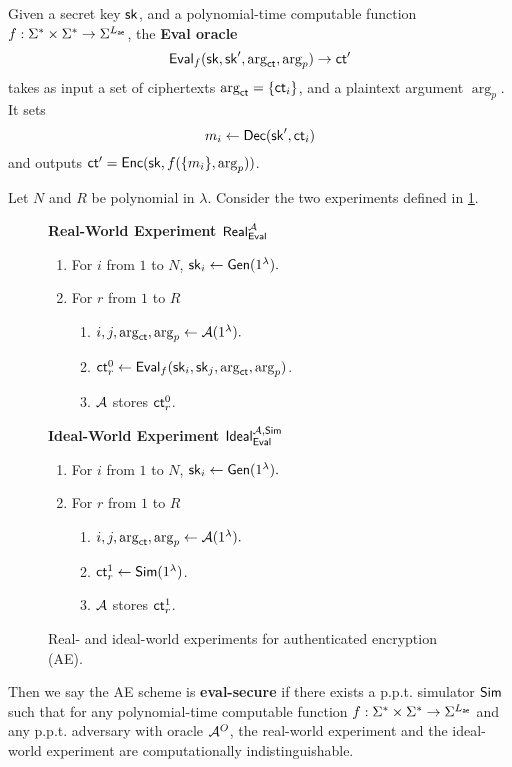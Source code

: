 \begin{definition}
\label{defn:AE-eval-oracle}
Given a secret key ${\mathsf{sk}}$, and a polynomial-time computable function $f: \Sigma^* \times \Sigma^* \to \Sigma^{L_{\mathsf{ae}}}$, the \textbf{Eval oracle} 
$$\mathsf{Eval}_{f}({\mathsf{sk}}, {\mathsf{sk}}', \arg_{\mathsf{ct}}, \arg_p) \to \mathsf{ct}'$$ takes as input a set of ciphertexts $\arg_{\mathsf{ct}} = \{\mathsf{ct}_i\}$, and a plaintext argument $\arg_{p}$. It sets 
$$m_i \leftarrow \mathsf{Dec}({\mathsf{sk}}', \mathsf{ct}_i)$$ 
and outputs $\mathsf{ct}' = \mathsf{Enc}({\mathsf{sk}}, f(\{m_i\}, \arg_p))$.
\end{definition}
\begin{definition}
\label{defn:AE-eval-security}
Let $N$ and $R$ be polynomial in $\lambda$. Consider the two experiments defined in \cref{expr:AE-real-ideal-world}.

\begin{figure}[ht!]
\begin{framed}
\textbf{Real-World Experiment $\mathsf{Real}_{\mathsf{Eval}}^{\mathcal{A}}$}
\begin{enumerate}
    \item For $i$ from $1$ to $N$, ${\mathsf{sk}}_i \leftarrow \mathsf{Gen}(1^{\lambda}).$
    \item For $r$ from $1$ to $R$
    \begin{enumerate}
        \item $i, j, \arg_{\mathsf{ct}}, \arg_p \leftarrow \mathcal{A}(1^{\lambda}).$
        \item $\mathsf{ct}^{0}_r \leftarrow \mathsf{Eval}_f({\mathsf{sk}}_i, {\mathsf{sk}}_j, \arg_{\mathsf{ct}}, \arg_p)$.
        \item $\mathcal{A}$ stores $\mathsf{ct}^{0}_r$.
    \end{enumerate}
\end{enumerate}
\vspace{0.2cm}
\textbf{Ideal-World Experiment $\mathsf{Ideal}_{\mathsf{Eval}}^{\mathcal{A}, \mathsf{Sim}}$}
\begin{enumerate}
    \item For $i$ from $1$ to $N$, ${\mathsf{sk}}_i \leftarrow \mathsf{Gen}(1^{\lambda}).$
    \item For $r$ from $1$ to $R$
    \begin{enumerate}
        \item $i, j, \arg_{\mathsf{ct}}, \arg_p \leftarrow \mathcal{A}(1^{\lambda}).$
        \item $\mathsf{ct}^{1}_r \leftarrow \mathsf{Sim}(1^{\lambda})$.
        \item $\mathcal{A}$ stores $\mathsf{ct}^{1}_r$.
    \end{enumerate}
\end{enumerate}
\end{framed}
\caption{Real- and ideal-world experiments for authenticated encryption (AE).}
\label{expr:AE-real-ideal-world}
\end{figure}

Then we say the AE scheme is \textbf{eval-secure} if there exists a p.p.t. simulator $\mathsf{Sim}$ such that for any polynomial-time computable function $f: \Sigma^* \times \Sigma^* \to \Sigma^{L_{\mathsf{ae}}}$ and any p.p.t. adversary with oracle $\mathcal{A}^O$, the real-world experiment and the ideal-world experiment are computationally indistinguishable.
\end{definition}
